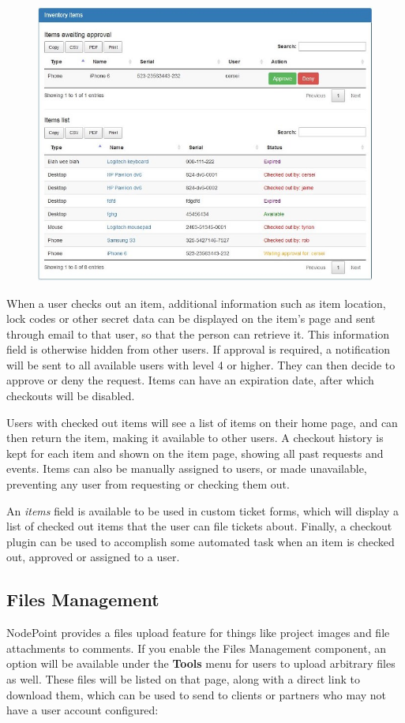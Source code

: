 \documentclass[11pt]{article}
\begin{document}
\begin{figure}[h]
\includegraphics{items.jpg}
\end{figure}

When a user checks out an item, additional information such as item location, lock codes or other secret data can be displayed on the item's page and sent through email to that user, so that the person can retrieve it. This information field is otherwise hidden from other users. If approval is required, a notification will be sent to all available users with level 4 or higher. They can then decide to approve or deny the request. Items can have an expiration date, after which checkouts will be disabled.

Users with checked out items will see a list of items on their home page, and can then return the item, making it available to other users. A checkout history is kept for each item and shown on the item page, showing all past requests and events. Items can also be manually assigned to users, or made unavailable, preventing any user from requesting or checking them out.

An \textit{items} field is available to be used in custom ticket forms, which will display a list of checked out items that the user can file tickets about. Finally, a checkout plugin can be used to accomplish some automated task when an item is checked out, approved or assigned to a user.

\subsection{Files Management}
NodePoint provides a files upload feature for things like project images and file attachments to comments. If you enable the Files Management component, an option will be available under the \textbf{Tools} menu for users to upload arbitrary files as well. These files will be listed on that page, along with a direct link to download them, which can be used to send to clients or partners who may not have a user account configured:
\end{document}
